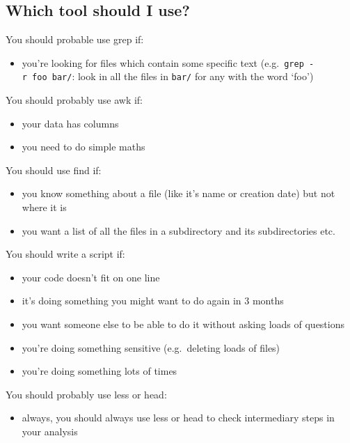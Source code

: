 \documentclass[11pt]{article}
\providecommand{\tightlist}{%
      \setlength{\itemsep}{0pt}\setlength{\parskip}{0pt}}
\begin{document}
\hypertarget{which-tool-should-i-use}{%
\subsection{Which tool should I use?}\label{which-tool-should-i-use}}

You should probable use grep if:

\begin{itemize}
\tightlist
\item
  you're looking for files which contain some specific text
  (e.g.~\texttt{grep\ -r\ foo\ bar/}: look in all the files in
  \texttt{bar/} for any with the word `foo')
\end{itemize}

You should probably use awk if:

\begin{itemize}
\tightlist
\item
  your data has columns
\item
  you need to do simple maths
\end{itemize}

You should use find if:

\begin{itemize}
\tightlist
\item
  you know something about a file (like it's name or creation date) but
  not where it is
\item
  you want a list of all the files in a subdirectory and its
  subdirectories etc.
\end{itemize}

You should write a script if:

\begin{itemize}
\tightlist
\item
  your code doesn't fit on one line
\item
  it's doing something you might want to do again in 3 months
\item
  you want someone else to be able to do it without asking loads of
  questions
\item
  you're doing something sensitive (e.g.~deleting loads of files)
\item
  you're doing something lots of times
\end{itemize}

You should probably use less or head:

\begin{itemize}
\tightlist
\item
  always, you should always use less or head to check intermediary steps
  in your analysis
\end{itemize}


\end{document}
